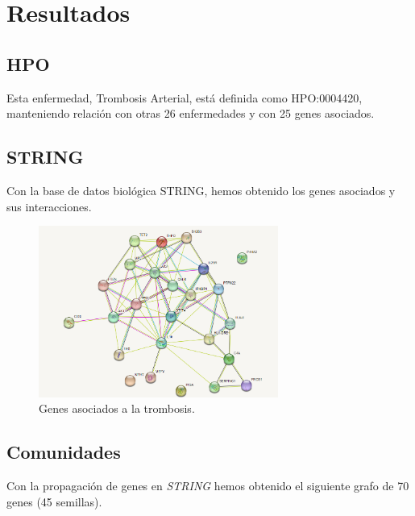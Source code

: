  \newpage
 \section{Resultados}
 
 \subsection{HPO}
 Esta enfermedad, Trombosis Arterial, está definida como HPO:0004420, manteniendo relación con otras 26 enfermedades y con 25 genes asociados.
 
 \subsection{STRING}
 Con la base de datos biológica STRING, hemos obtenido los genes asociados y sus interacciones.
\begin{figure}[h]
	\centering
	\includegraphics[width=0.70\textwidth]{figures/genes_asociados.png}
	\caption{Genes asociados a la trombosis.}
	\label{fig: Figura 3}
\end{figure}


\subsection{Comunidades}
Con la propagación de genes en \textit{STRING} hemos obtenido el siguiente grafo de 70 genes (45 semillas).

